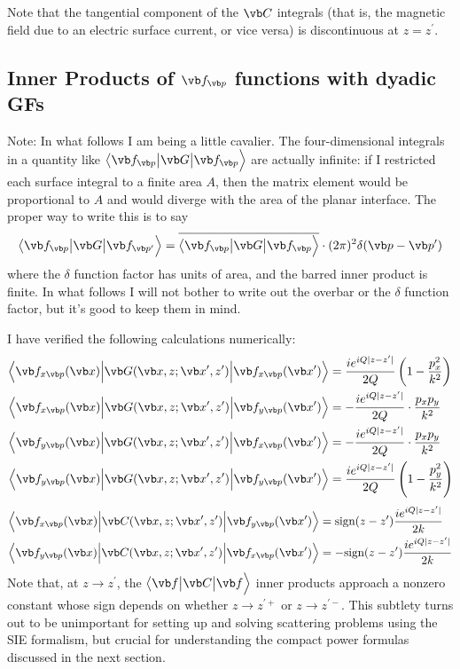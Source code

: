 \documentclass{article}
\newcommand{\vmv}[3]{ \big\langle #1 \big| #2 \big| #3 \Big\rangle}
\newcommand{\VMV}[3]{ \Big\langle #1 \Big| #2 \Big| #3 \Big\rangle}
\begin{document}
Note that the tangential component of the $\vb C$ integrals 
(that is, the magnetic field due to an electric surface current, 
or vice versa) is discontinuous at $z=z^\prime$.

\subsection{Inner Products of $\vb f_{\vb p}$ functions with dyadic GFs}

Note: In what follows I am being a little cavalier. The four-dimensional
integrals in a quantity like 
$\vmv{\vb f_{\vb p}}{\vb G}{\vb f_{\vb p}}$ are actually
infinite: if I restricted each surface integral to a finite 
area $A$, then the matrix element would be proportional to 
$A$ and would diverge with the area of the planar interface.
The proper way to write this is to say
$$  \vmv{\vb f_{\vb p}}{\vb G}{\vb f_{\vb p^\prime}}
  = \overline{\vmv{\vb f_{\vb p}}{\vb G}{\vb f_{\vb p}}}
    \cdot (2\pi)^2 \delta(\vb p-\vb p^\prime)
$$
where the $\delta$ function factor has units of area,
and the barred inner product is finite. In what follows I
will not bother to write out the overbar or the 
$\delta$ function factor, but it's good to keep them
in mind.

I have verified the following calculations numerically:
\begin{align*} 
 \VMV{ \vb f_{x\vb p}(\vb x) }
     { \vb G(\vb x, z; \vb x^\prime, z^\prime) }
     { \vb f_{x\vb p}(\vb x^\prime) }
 &= \frac{ ie^{iQ|z-z^\prime|} }{2Q}\left(1-\frac{p_x^2}{k^2}\right)
\\
 \VMV{ \vb f_{x\vb p}(\vb x) }
     { \vb G(\vb x, z; \vb x^\prime, z^\prime) }
     { \vb f_{y\vb p}(\vb x^\prime) }
 &= -\frac{ ie^{iQ|z-z^\prime|} }{2Q} \cdot \frac{p_x p_y}{k^2}
\\
 \VMV{ \vb f_{y\vb p}(\vb x) }
     { \vb G(\vb x, z; \vb x^\prime, z^\prime) }
     { \vb f_{x\vb p}(\vb x^\prime) }
 &= -\frac{ ie^{iQ|z-z^\prime|} }{2Q} \cdot \frac{p_x p_y}{k^2}
\\
 \VMV{ \vb f_{y\vb p}(\vb x) }
     { \vb G(\vb x, z; \vb x^\prime, z^\prime) }
     { \vb f_{y\vb p}(\vb x^\prime) }
 &= \frac{ ie^{iQ|z-z^\prime|} }{2Q}\left(1-\frac{p_y^2}{k^2}\right)
\end{align*} 
\begin{align*} 
 \VMV{ \vb f_{x\vb p}(\vb x) }
     { \vb C(\vb x, z; \vb x^\prime, z^\prime) }
     { \vb f_{y\vb p}(\vb x^\prime) }
 &=  \text{sign}(z-z^\prime) \frac{ i e^{iQ|z-z^\prime|} }{2k}
\\
 \VMV{ \vb f_{y\vb p}(\vb x) }
     { \vb C(\vb x, z; \vb x^\prime, z^\prime) }
     { \vb f_{x\vb p}(\vb x^\prime) }
 &= -\text{sign}(z-z^\prime) \frac{ i e^{iQ|z-z^\prime|} }{2k}
\end{align*} 
%
Note that, at $z\to z^\prime$, the $\vmv{\vb f}{\vb C}{\vb f}$
inner products approach a nonzero constant whose sign depends 
on whether $z\to z^{\prime +}$ or $z\to z^{\prime -}$. This 
subtlety turns out to be unimportant for setting up and 
solving scattering problems using the SIE formalism, but 
crucial for understanding the compact power formulas discussed
in the next section.
\end{document}
